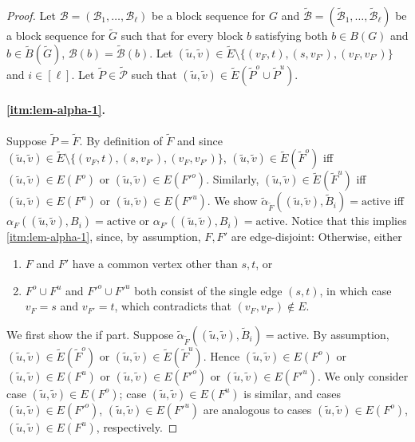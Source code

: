 \documentclass[fontsize=11pt,paper=a4]{book}
\begin{document}
\begin{proof}
Let \(\mathcal{B}=(\mathscr{B}_1,\dots,\mathscr{B}_{\ell})\) be a block sequence for \(G\) and \(\tilde{\mathcal{B}}=(\tilde{\mathscr{B}}_1,\dots,\tilde{\mathscr{B}}_{\ell})\) be a block sequence for \(\tilde{G}\) such that for every block \(b\) satisfying both \(b\in B(G)\) and \(b\in\tilde{B}(\tilde{G})\), \(\mathcal{B}(b)=\tilde{\mathcal{B}}(b)\).
Let \((\tilde{u},\tilde{v})\in\tilde{E}\setminus\{(v_F,t),(s,v_{F'}),(v_F,v_{F'})\}\) and \(i\in[\ell]\).
Let \(\tilde{P}\in\tilde{\mathcal{P}}\) such that \((\tilde{u},\tilde{v})\in\tilde{E}(\tilde{P}^o\cup\tilde{P}^u)\).

\paragraph{\ref{itm:lem-alpha-1}.}
Suppose \(\tilde{P}=\tilde{F}\).
By definition of \(\tilde{F}\) and since \((\tilde{u},\tilde{v})\in\tilde{E}\setminus\{(v_F,t),(s,v_{F'}),(v_F,v_{F'})\}\), \((\tilde{u},\tilde{v})\in\tilde{E}(\tilde{F}^o)\) iff \((\tilde{u},\tilde{v})\in E(F^o)\) or \((\tilde{u},\tilde{v})\in E(F'^o)\).
Similarly, \((\tilde{u},\tilde{v})\in\tilde{E}(\tilde{F}^u)\) iff \((\tilde{u},\tilde{v})\in E(F^u)\) or \((\tilde{u},\tilde{v})\in E(F'^u)\).
We show \(\tilde{\alpha}_{\tilde{F}}((\tilde{u},\tilde{v}),\tilde{B}_i)=\mathrm{active}\) iff \(\alpha_F((\tilde{u},\tilde{v}),B_i)=\mathrm{active}\) or \(\alpha_{F'}((\tilde{u},\tilde{v}),B_i)=\mathrm{active}\).
Notice that this implies \ref{itm:lem-alpha-1}, since, by assumption, \(F,F'\) are edge-disjoint: Otherwise, either

\begin{enumerate}
\item \(F\) and \(F'\) have a common vertex other than \(s,t\), or

\item \(F^o\cup F^u\) and \(F'^o\cup F'^u\) both consist of the single edge \((s,t)\), in which case \(v_F=s\) and \(v_{F'}=t\), which contradicts that \((v_F,v_{F'})\notin E\).
\end{enumerate}


We first show the if part.
Suppose \(\tilde{\alpha}_{\tilde{F}}((\tilde{u},\tilde{v}),\tilde{B}_i)=\mathrm{active}\).
By assumption, \((\tilde{u},\tilde{v})\in\tilde{E}(\tilde{F}^o)\) or \((\tilde{u},\tilde{v})\in\tilde{E}(\tilde{F}^u)\).
Hence \((\tilde{u},\tilde{v})\in E(F^o)\) or \((\tilde{u},\tilde{v})\in E(F^u)\) or \((\tilde{u},\tilde{v})\in E(F'^o)\) or \((\tilde{u},\tilde{v})\in E(F'^u)\).
We only consider case \((\tilde{u},\tilde{v})\in E(F^o)\); case \((\tilde{u},\tilde{v})\in E(F^u)\) is similar, and cases \((\tilde{u},\tilde{v})\in E(F'^o)\), \((\tilde{u},\tilde{v})\in E(F'^u)\) are analogous to cases \((\tilde{u},\tilde{v})\in E(F^o)\), \((\tilde{u},\tilde{v})\in E(F^u)\), respectively.


\end{proof}
\end{document}
